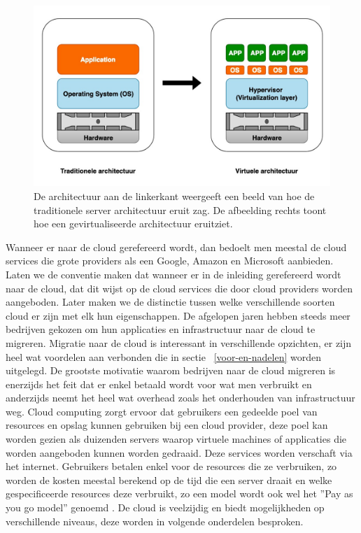 \newline
\newline
\begin{figure}
    \includegraphics[width=1\textwidth]{img/klassiek_virtualisatie}
    \caption{De architectuur aan de linkerkant weergeeft een beeld van hoe de traditionele server architectuur eruit zag. De afbeelding rechts toont hoe een gevirtualiseerde architectuur eruitziet.} 
    \label{fig:klassiek-vs-virtualisatie}  
\end{figure}
\newline

Wanneer er naar de cloud gerefereerd wordt, dan bedoelt men meestal de cloud services die grote providers als een Google, Amazon en Microsoft aanbieden. Laten we de conventie maken dat wanneer er in de inleiding gerefereerd wordt naar de cloud, dat dit wijst op de cloud services die door cloud providers worden aangeboden. Later maken we de distinctie tussen welke verschillende soorten cloud er zijn met elk hun eigenschappen. De afgelopen jaren hebben steeds meer bedrijven gekozen om hun applicaties en infrastructuur naar de cloud te migreren. Migratie naar de cloud is interessant in verschillende opzichten, er zijn heel wat voordelen aan verbonden die in sectie ~\ref{voor-en-nadelen} worden uitgelegd. De grootste motivatie waarom bedrijven naar de cloud migreren is enerzijds het feit dat er enkel betaald wordt voor wat men verbruikt en anderzijds neemt het heel wat overhead zoals het onderhouden van infrastructuur weg. Cloud computing zorgt ervoor dat gebruikers een gedeelde poel van resources en opslag kunnen gebruiken bij een cloud provider, deze poel kan worden gezien als duizenden servers waarop virtuele machines of applicaties die worden aangeboden kunnen worden gedraaid. Deze services worden verschaft via het internet. Gebruikers betalen enkel voor de resources die ze verbruiken, zo worden de kosten meestal berekend op de tijd die een server draait en welke gespecificeerde resources deze verbruikt, zo een model wordt ook wel het ''Pay as you go model'' genoemd . De cloud is veelzijdig en biedt mogelijkheden op verschillende niveaus, deze worden in volgende onderdelen besproken.\autocite{Seghal2018} 


